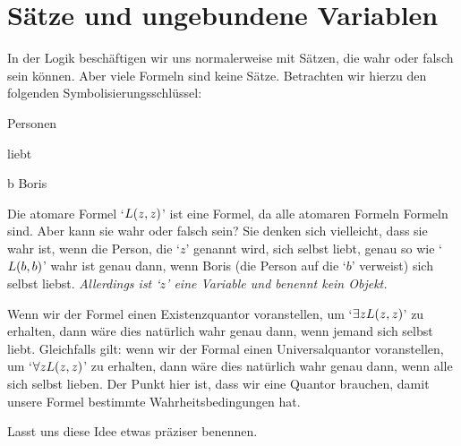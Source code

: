 

\section{Sätze und ungebundene Variablen}
In der Logik beschäftigen wir uns normalerweise mit Sätzen, die wahr oder falsch sein können. Aber viele Formeln sind keine Sätze. Betrachten wir hierzu den folgenden Symbolisierungsschlüssel:
	\begin{ekey}
		\item[\text{Domäne}] Personen
		\item[\atom{L}{x,y}]  liebt 
		\item[b] Boris
	\end{ekey}
Die atomare Formel `$\mathord{L}(z,z)$' ist eine Formel, da alle atomaren Formeln Formeln sind. Aber kann sie wahr oder falsch sein? Sie denken sich vielleicht, dass sie wahr ist, wenn die Person, die `$z$' genannt wird, sich selbst liebt, genau so wie `$\mathord{L}(b,b)$' wahr ist genau dann, wenn Boris (die Person auf die `$b$' verweist) sich selbst liebst. \emph{Allerdings ist `$z$' eine Variable und benennt kein Objekt.}

Wenn wir der Formel einen Existenzquantor voranstellen, um `$\exists z\mathord{L}(z,z)$' zu erhalten, dann wäre dies natürlich wahr genau dann, wenn jemand sich selbst liebt. Gleichfalls gilt: wenn wir der Formal einen Universalquantor voranstellen, um `$\forall z \mathord{L}(z,z)$' zu erhalten, dann wäre dies natürlich wahr genau dann, wenn alle sich selbst lieben. Der Punkt hier ist, dass wir eine Quantor brauchen, damit unsere Formel bestimmte Wahrheitsbedingungen hat. 

Lasst uns diese Idee etwas präziser benennen.


